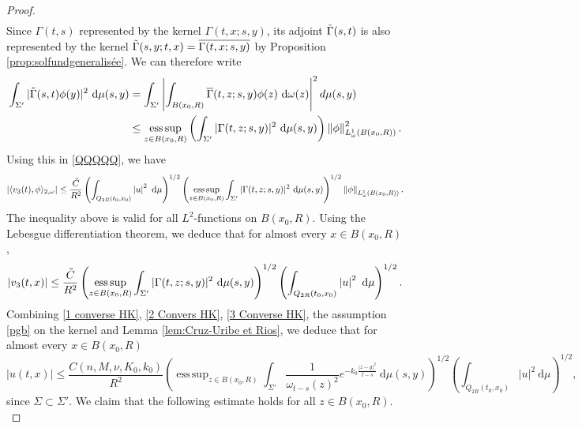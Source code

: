 \documentclass[12pt, letterpaper]{amsart}
\theoremstyle{definition}
\theoremstyle{remark}
\numberwithin{equation}{section}
\DeclareMathOperator*{\supess}{ess\,sup}
\begin{document}
\begin{proof}
\begin{align}
\end{align}
Since $\Gamma(t,s)$ represented by the kernel $\Gamma(t,x;s,y)$, its adjoint $\Tilde{\Gamma}(s,t)$ is also represented by the kernel $\Tilde{\Gamma}(s,y;t,x)= \overline{\Gamma(t,x;s,y)}$ by Proposition \ref{prop:solfundgeneralisée}. We can therefore write 
\begin{align*}
    \int_{\Sigma'} |  \Tilde{\Gamma}(s,t)\phi (y)    |^2 \ \mathrm d\mu(s,y) &= \int_{\Sigma'} \left | \int_{B(x_0,R)}  \overline{\Gamma}(t,z;s,y) \phi(z)\ \mathrm d\omega(z) \right |^2 d \mu(s,y)
    \\ & \leq \supess_{z \in B(x_0,R)} \left ( \int_{\Sigma'}  | \Gamma(t,z;s,y)  |^2 \ \mathrm d\mu(s,y)  \right ) \left \| \phi \right \|^2_{L^1_\omega(B(x_0,R))}.
\end{align*}
Using this in \eqref{QQQQQ}, we have 
\begin{equation*}
    \left |  \langle v_3(t), \phi \rangle_{2,\omega} \right |\leq \frac{\Tilde{C}}{R^2}  \left ( \int_{Q_{2R}(t_0,x_0) } \left |  u  \right |^2 \ \mathrm d\mu \right )^{1/2} \left (\supess_{z \in B(x_0,R)} \int_{\Sigma'}  | \Gamma(t,z;s,y)     |^2 \ \mathrm d\mu(s,y)  \right )^{1/2} \left \| \phi \right \|_{L^1_\omega(B(x_0,R))}.
\end{equation*}
The inequality above is valid for all $L^2$-functions on $B(x_0,R)$. Using the Lebesgue differentiation theorem, we deduce that for almost every $x \in B(x_0,R)$,
\begin{equation}\label{3 Converse HK}
    \left |  v_3(t,x) \right | \leq  \frac{\Tilde{C}}{R^2} \left (\supess_{z \in B(x_0,R)} \int_{\Sigma'} | \Gamma(t,z;s,y)     |^2 \ \mathrm d\mu(s,y)  \right )^{1/2} \left ( \int_{Q_{2R}(t_0,x_0) } \left |  u  \right |^2 \ \mathrm d\mu \right )^{1/2}  .
\end{equation}
Combining \eqref{1 converse HK}, \eqref{2 Convers HK}, \eqref{3 Converse HK}, the assumption \eqref{pgb} on the kernel and Lemma \ref{lem:Cruz-Uribe et Rios}, we deduce that for almost every $x \in B(x_0,R)$
\begin{equation}\label{LL}
    \left |  u(t,x) \right | \leq  \frac{C(n,M,\nu,K_0,k_0)}{R^2} \left (\supess_{z \in B(x_0,R)} \int_{\Sigma'} \frac{1}{\omega_{t-s}(z)^2} e ^{-k_0 \frac{\left | z-y \right |^2}{t-s}} \ \mathrm d\mu(s,y)  \right )^{1/2} \left ( \int_{Q_{2R}(t_0,x_0) } \left |  u  \right |^2 \ \mathrm d\mu \right )^{1/2},
\end{equation}
since $\Sigma \subset \Sigma'$. We claim that the following estimate holds for all $z \in B(x_0,R)$.
\begin{equation}\label{Poids}

\end{equation}
\end{proof}
\end{document}
